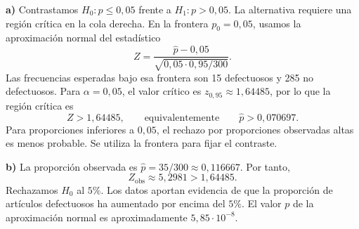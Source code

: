 \textbf{a)} Contrastamos $H_0:p\le0{,}05$ frente a $H_1:p>0{,}05$. La alternativa requiere una región crítica en la cola derecha. En la frontera $p_0=0{,}05$, usamos la aproximación normal del estadístico
\[
 Z=\frac{\hat p-0{,}05}{\sqrt{0{,}05\cdot0{,}95/300}}.
\]
Las frecuencias esperadas bajo esa frontera son 15 defectuosos y 285 no defectuosos. Para $\alpha=0{,}05$, el valor crítico es $z_{0{,}95}\approx1{,}64485$, por lo que la región crítica es
\[
 \boxed{Z>1{,}64485},
 \qquad\text{equivalentemente}\qquad\hat p>0{,}070697.
\]
Para proporciones inferiores a $0{,}05$, el rechazo por proporciones observadas altas es menos probable. Se utiliza la frontera para fijar el contraste.

\textbf{b)} La proporción observada es $\hat p=35/300\approx0{,}116667$. Por tanto,
\[
 Z_{\mathrm{obs}}\approx5{,}2981>1{,}64485.
\]
Rechazamos $H_0$ al $5\%$. Los datos aportan evidencia de que la proporción de artículos defectuosos ha aumentado por encima del $5\%$. El valor $p$ de la aproximación normal es aproximadamente $5{,}85\cdot10^{-8}$.
